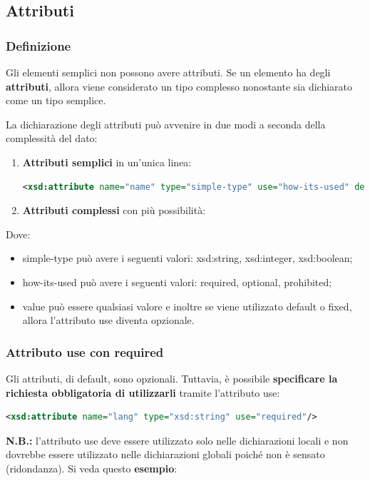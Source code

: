 \documentclass[a4paper]{article}
\begin{document}
	\subsection{Attributi}
	
	\subsubsection{Definizione}\label{par: Attributi - Definizione}
	
	Gli elementi semplici non possono avere attributi. Se un elemento ha degli \textcolor{Red3}{\textbf{attributi}}, allora viene considerato un tipo complesso nonostante sia dichiarato come un tipo semplice.\newline
	
	\noindent
	La dichiarazione degli attributi può avvenire in due modi a seconda della complessità del dato:
	\begin{enumerate}
		\item \textbf{Attributi semplici} in un'unica linea:
		\begin{lstlisting}[language=XML]
<xsd:attribute name="name" type="simple-type" use="how-its-used" default/fixed="value"/>\end{lstlisting}
		
		\item \textbf{Attributi complessi} con più possibilità:
		
	\end{enumerate}
	Dove:
	\begin{itemize}
		\item \textsf{simple-type} può avere i seguenti valori: \textsf{xsd:string}, \textsf{xsd:integer}, \textsf{xsd:boolean};
		
		\item \textsf{how-its-used} può avere i seguenti valori: \textsf{required}, \textsf{optional}, \textsf{prohibited};
		
		\item \textsf{value} può essere qualsiasi valore e inoltre se viene utilizzato \textsf{default} o \textsf{fixed}, allora l'attributo \textsf{use} diventa opzionale.
	\end{itemize}\newpage
	
	\subsubsection{Attributo \textsf{use} con \textsf{required}}
	
	Gli attributi, di default, sono opzionali. Tuttavia, è possibile \textbf{specificare la richiesta obbligatoria di utilizzarli} tramite l'attributo \textsf{use}:
	\begin{lstlisting}[language=XML]
<xsd:attribute name="lang" type="xsd:string" use="required"/>\end{lstlisting}
	\textbf{N.B.:} l'attributo \textsf{use} deve essere utilizzato solo nelle dichiarazioni locali e non dovrebbe essere utilizzato nelle dichiarazioni globali poiché non è sensato (ridondanza). Si veda questo \textcolor{Green4}{\textbf{esempio}}:
	
	
\end{document}
